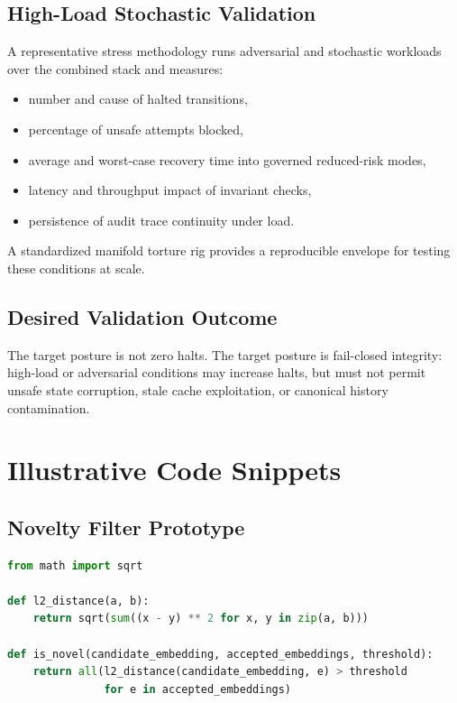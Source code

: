 \documentclass[11pt]{article}
\begin{document}
\subsection{High-Load Stochastic Validation}
A representative stress methodology runs adversarial and stochastic workloads over the combined stack and measures:
\begin{itemize}[leftmargin=1cm]
  \item number and cause of halted transitions,
  \item percentage of unsafe attempts blocked,
  \item average and worst-case recovery time into governed reduced-risk modes,
  \item latency and throughput impact of invariant checks,
  \item persistence of audit trace continuity under load.
\end{itemize}

A standardized manifold torture rig provides a reproducible envelope for testing these conditions at scale.

\subsection{Desired Validation Outcome}
The target posture is not zero halts. The target posture is fail-closed integrity: high-load or adversarial conditions may increase halts, but must not permit unsafe state corruption, stale cache exploitation, or canonical history contamination.

\section{Illustrative Code Snippets}
\subsection{Novelty Filter Prototype}
\begin{lstlisting}[language=Python,caption={Euclidean novelty predicate for idea embeddings}]
from math import sqrt

def l2_distance(a, b):
    return sqrt(sum((x - y) ** 2 for x, y in zip(a, b)))

def is_novel(candidate_embedding, accepted_embeddings, threshold):
    return all(l2_distance(candidate_embedding, e) > threshold
               for e in accepted_embeddings)
\end{lstlisting}
\end{document}
